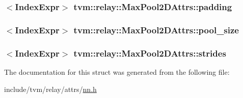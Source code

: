 \subsubsection[{\texorpdfstring{padding}{padding}}]{$<${\bf Index\+Expr}$>$ tvm\+::relay\+::\+Max\+Pool2\+D\+Attrs\+::padding}\hypertarget{structtvm_1_1relay_1_1MaxPool2DAttrs_a801de4e07dd395a5e4492f9a289e7cdb}{}\label{structtvm_1_1relay_1_1MaxPool2DAttrs_a801de4e07dd395a5e4492f9a289e7cdb}
\subsubsection[{\texorpdfstring{pool\+\_\+size}{pool_size}}]{$<${\bf Index\+Expr}$>$ tvm\+::relay\+::\+Max\+Pool2\+D\+Attrs\+::pool\+\_\+size}\hypertarget{structtvm_1_1relay_1_1MaxPool2DAttrs_a7cf50a702126aab8f4a3458eb09fc556}{}\label{structtvm_1_1relay_1_1MaxPool2DAttrs_a7cf50a702126aab8f4a3458eb09fc556}
\subsubsection[{\texorpdfstring{strides}{strides}}]{$<${\bf Index\+Expr}$>$ tvm\+::relay\+::\+Max\+Pool2\+D\+Attrs\+::strides}\hypertarget{structtvm_1_1relay_1_1MaxPool2DAttrs_a56524c8a3dbc632021ac133f4270c301}{}\label{structtvm_1_1relay_1_1MaxPool2DAttrs_a56524c8a3dbc632021ac133f4270c301}


The documentation for this struct was generated from the following file\+:\begin{DoxyCompactItemize}
\item 
include/tvm/relay/attrs/\hyperlink{include_2tvm_2relay_2attrs_2nn_8h}{nn.\+h}\end{DoxyCompactItemize}
